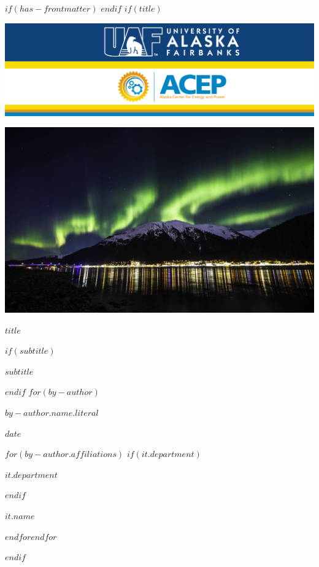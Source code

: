 $if(has-frontmatter)$
\frontmatter
$endif$
$if(title)$
\cleardoublepage
\thispagestyle{empty}
{\centering
\par\noindent\includegraphics[width=\textwidth]{images/banner_acep_uaf.png}
\par\noindent\includegraphics[width=\textwidth]{images/jnu_aurora.jpeg}
\vspace{3ex}
{\huge\bfseries $title$ \par}
$if(subtitle)$
{\Large $subtitle$ \par}
$endif$
\vspace{3ex}
$for(by-author)$
{\Large $by-author.name.literal$ \par}
\vspace{3ex}
{\bfseries\large $date$ \par}
\vspace{12ex}
$for(by-author.affiliations)$%
$if(it.department)$%
{\bfseries\large $it.department$ \par}
\vspace{3ex}
$endif$%
{\bfseries\large $it.name$ \par}
$endfor$$endfor$%
}
$endif$